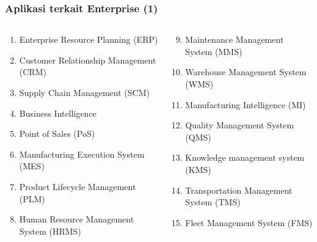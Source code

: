 \documentclass[aspectratio=169, table]{beamer}
\begin{document}
\begin{frame}
	\frametitle{Aplikasi terkait Enterprise (1)}
    \vspace{20pt}
	\begin{columns}
		\begin{column}{0.5\textwidth}
				\begin{enumerate}
					\item Enterprise Resource Planning (ERP)
					\item Customer Relationship Management (CRM)
					\item Supply Chain Management (SCM)
					\item Business Intelligence
					\item Point of Sales (PoS)
					\item Manufacturing Execution System (MES)
					\item Product Lifecycle Management (PLM)
					\item Human Resource Management System (HRMS)
				\end{enumerate}
		\end{column}
		\begin{column}{0.5\textwidth}
				\begin{enumerate}
					\setcounter{enumi}{8}
                    \item Maintenance Management System (MMS)
					\item Warehouse Management System (WMS)
					\item Manufacturing Intelligence (MI)
					\item Quality Management System (QMS)
					\item Knowledge management system (KMS)
					\item Transportation Management System (TMS)
					\item Fleet Management System (FMS)
				\end{enumerate}
		\end{column}
	\end{columns}
\end{frame}
\end{document}
